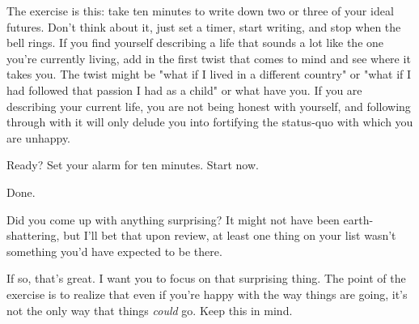 \documentclass[]{book}
\begin{document}
The exercise is this: take ten minutes to write down two or three of your ideal
futures. Don't think about it, just set a timer, start writing, and stop when
the bell rings. If you find yourself describing a life that sounds a lot like
the one you're currently living, add in the first twist that comes to mind and
see where it takes you. The twist might be "what if I lived in a different
country" or "what if I had followed that passion I had as a child" or what have
you. If you are describing your current life, you are not being honest with
yourself, and following through with it will only delude you into fortifying the
status-quo with which you are unhappy.

Ready? Set your alarm for ten minutes. Start now.

Done.

Did you come up with anything surprising? It might not have been
earth-shattering, but I'll bet that upon review, at least one thing on your list
wasn't something you'd have expected to be there.

If so, that's great. I want you to focus on that surprising thing. The point of
the exercise is to realize that even if you're happy with the way things are
going, it's not the only way that things \textit{could} go. Keep this in mind.
\end{document}
